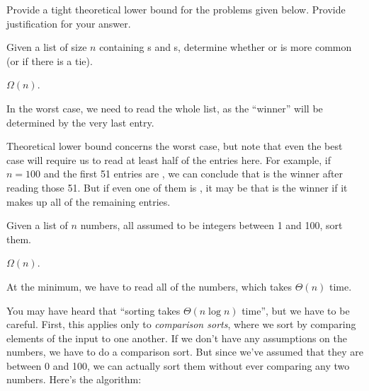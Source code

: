 \begin{prob}
    Provide a tight theoretical lower bound for the problems given below. Provide justification for your answer.

    \begin{subprobset}

        \begin{subprob}
            Given a list of size $n$ containing s and s, determine whether  or
             is more common (or if there is a tie).

            \begin{soln}
                $\Omega(n)$.

                In the worst case, we need to read the whole list, as the ``winner'' will be determined by the very last entry.

                Theoretical lower bound concerns the worst case, but note that even the best case will require us to read at least
                half of the entries here. For example, if $n = 100$ and the first 51 entries are , we can conclude that
                 is the winner after reading those 51. But if even one of them is , it may be that
                 is the winner if it makes up all of the remaining entries.
            \end{soln}

        \end{subprob}

        \begin{subprob}
            Given a list of $n$ numbers, all assumed to be integers between 1 and 100, sort them.

            \begin{soln}
                $\Omega(n)$.

                At the minimum, we have to read all of the numbers, which takes $\Theta(n)$ time.

                You may have heard that ``sorting takes $\Theta(n \log n)$ time'', but we have to be careful. First,
                this applies only to \emph{comparison sorts}, where we sort by comparing elements of the input to one another.
                If we don't have any assumptions on the numbers, we have to do a comparison sort. But since we've assumed that
                they are between 0 and 100, we can actually sort them without ever comparing any two numbers. Here's the algorithm:


\end{soln}
\end{subprob}
\end{subprobset}
\end{prob}
